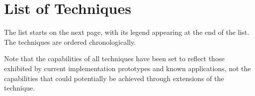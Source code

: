 %

\chapter{List of Techniques}

The list starts on the next page, with its legend appearing at the end of the
list.
%
The techniques are ordered chronologically.

Note that the capabilities of all techniques have been set to reflect those
exhibited by current implementation prototypes and known applications, not the
capabilities that could potentially be achieved through extensions of the
technique.

\begingroup
\small

\def\abbvPrinciple{PR}
\def\abbvScope{SC}
\def\abbvOptimal{OP}
\def\abbvMultiOutOp{MO}
\def\abbvDisjointOutOp{DO}
\def\abbvIntBlockOp{IB}
\def\abbvIntDepOp{IN}

\def\pME{ME}
\def\pMEPlusAppend{$^{+}$}
\def\pMEPlusInText{\pME\pMEPlusAppend}
\def\pMEPlus{%
  \pME\rlap{\pMEPlusAppend}%
}
\def\pTC{TC}
\def\pDC{DC}
\def\pTD{TD}
\def\pGC{GC}
\def\pMS{MS}
\def\notSupported{%
  \tikz{%
    \node [not supported] {};
  }%
}
\def\partSupported{%
  \tikz{%
    \node [not supported] (c) {};
    \draw [draw=none, fill=black]
          (c.south) arc (270:90:\pgfkeysvalueof{/tikz/circle radius})
          --
          cycle;
  }%
}
\def\fullySupported{%
  \tikz{%
    \node [fully supported] {};
  }%
}
\newcommand{\shrinkSupportCircle}[1]{%
  \maxsizebox{6pt}{6pt}{#1}%
}
\def\notSupportedSmall{%
  \shrinkSupportCircle{\notSupported}%
}
\def\partSupportedSmall{%
  \shrinkSupportCircle{\partSupported}%
}
\def\fullySupportedSmall{%
  \shrinkSupportCircle{\fullySupported}%
}
\def\localScope{L}
\def\globalScope{G}

\let\oldtabhead\tabhead
\renewcommand{\tabhead}[1]{%
  {\oldtabhead\relsize{.5}\textsc{\MakeLowercase{#1}}}%
}

